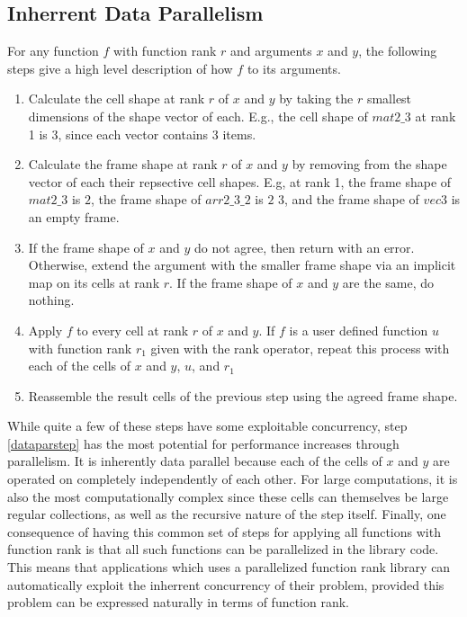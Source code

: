 \subsection{Inherrent Data Parallelism}
For any function $f$ with function rank $r$ and arguments $x$ and $y$, 
the following steps give a high level description of how $f$ to its arguments.\cite{rankanduni}
\begin{enumerate}
	\item Calculate the cell shape at rank $r$ of $x$ and $y$ 
		by taking the $r$ smallest dimensions of the shape vector of each.
		E.g., the cell shape of $mat2\_3$ at rank 1 is 3, since each vector contains 3 items.
	\item Calculate the frame shape at rank $r$ of $x$ and $y$ 
		by removing from the shape vector of each their repsective cell shapes.
		E.g, at rank 1, the frame shape of $mat2\_3$ is $2$,
		the frame shape of $arr2\_3\_2$ is $2$ $3$, 
		and the frame shape of $vec3$ is an empty frame.
	\item If the frame shape of $x$ and $y$ do not agree, then return with an error.
		Otherwise, extend the argument with the smaller frame shape via an implicit map on its cells at rank $r$.
		If the frame shape of $x$ and $y$ are the same, do nothing.
	\item \label{dataparstep}Apply $f$ to every cell at rank $r$ of $x$ and $y$.
		If $f$ is a user defined function $u$ with function rank $r_1$ given with the rank operator, 
		repeat this process with each of the cells of $x$ and $y$, $u$, and $r_1$
	\item Reassemble the result cells of the previous step using the agreed frame shape.
\end{enumerate}

While quite a few of these steps have some exploitable concurrency, 
step \ref{dataparstep} has the most potential for performance increases through parallelism.
It is inherently data parallel because each of the cells of $x$ and $y$ are operated on completely independently of each other.
For large computations, it is also the most computationally complex 
since these cells can themselves be large regular collections, 
as well as the recursive nature of the step itself.
Finally, one consequence of having this common set of steps for applying all functions with function rank is
that all such functions can be parallelized in the library code.
This means that applications which uses a parallelized function rank library 
can automatically exploit the inherrent concurrency of their problem, 
provided this problem can be expressed naturally in terms of function rank.

